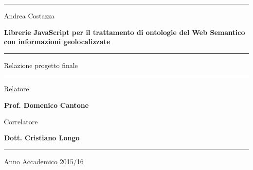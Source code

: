 \documentclass[a4paper,11pt]{article}
\begin{document}
\begin{center}
	\hrule
\end{center}

\vspace*{50pt}

\begin{center}
	\LARGE Andrea Costazza
\end{center}

\vspace*{30pt}

\begin{center}
	\LARGE \textbf{Librerie JavaScript per il trattamento di ontologie del Web Semantico con informazioni geolocalizzate}

\end{center}


\vspace*{80pt}

\noindent\hfil\rule{0.2\textwidth}{.4pt}\hfil

\begin{center}
	\Large Relazione progetto finale
\end{center}

\noindent\hfil\rule{0.2\textwidth}{.4pt}\hfil

\vspace*{180pt}

\begin{flushright}
	\Large Relatore

	\Large \textbf {Prof. Domenico Cantone}
\end{flushright}
\begin{flushright}
	\Large Correlatore

	\Large \textbf {Dott. Cristiano Longo}
\end{flushright}

\bigskip
\bigskip

\hrule

\begin{center}
	\Large Anno Accademico 2015/16
\end{center}
\thispagestyle{empty}
\newpage
\null
\thispagestyle{empty}

\newpage

\tableofcontents
\newpage
\end{document}
